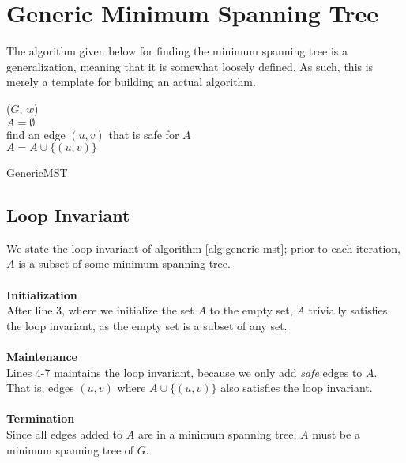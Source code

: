 \section{Generic Minimum Spanning Tree}
The algorithm given below for finding the minimum spanning tree is a
generalization, meaning that it is somewhat loosely defined. As such, this
is merely a template for building an actual algorithm.
\begin{algorithm}
	
	
	
	\BlankLine
	
	\GenericMST($G$, $w$) \\
	\Begin
	{
		$A = \emptyset$ \\
		{
			find an edge $(u, v)$ that is safe for $A$ \\
			$A = A \cup \{(u, v)\}$
		}
	}
	
	\caption{GenericMST}
	\label{alg:generic-mst}
\end{algorithm}
\subsection{Loop Invariant}
We state the loop invariant of algorithm \ref{alg:generic-mst}; prior to each
iteration, $A$ is a subset of some minimum spanning tree.
\\\\
\noindent \textbf{Initialization} \\
After line 3, where we initialize the set $A$ to the empty set, $A$ trivially
satisfies the loop invariant, as the empty set is a subset of any set.
\\\\
\noindent \textbf{Maintenance} \\
Lines 4-7 maintains the loop invariant, because we only add \textit{safe}
edges to $A$. That is, edges $(u, v)$ where $A \cup \{(u, v)\}$ also
satisfies the loop invariant.
\\\\
\noindent \textbf{Termination} \\
Since all edges added to $A$ are in a minimum spanning tree, $A$ must be a
minimum spanning tree of $G$.

